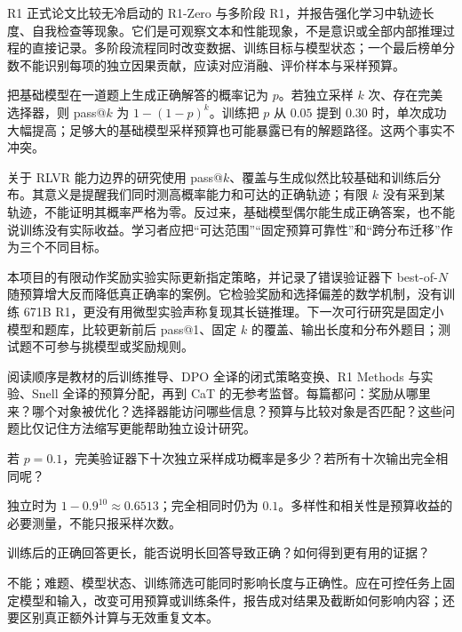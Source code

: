 R1 正式论文比较无冷启动的 R1-Zero 与多阶段 R1，并报告强化学习中轨迹长度、自我检查等现象。它们是可观察文本和性能现象，不是意识或全部内部推理过程的直接记录。多阶段流程同时改变数据、训练目标与模型状态；一个最后榜单分数不能识别每项的独立因果贡献，应读对应消融、评价样本与采样预算。

把基础模型在一道题上生成正确解答的概率记为 $p$。若独立采样 $k$ 次、存在完美选择器，则 pass@$k$ 为 $1-(1-p)^k$。训练把 $p$ 从 $0.05$ 提到 $0.30$ 时，单次成功大幅提高；足够大的基础模型采样预算也可能暴露已有的解题路径。这两个事实不冲突。

关于 RLVR 能力边界的研究\cite{rlvrboundary}使用 pass@$k$、覆盖与生成似然比较基础和训练后分布。其意义是提醒我们同时测高概率能力和可达的正确轨迹；有限 $k$ 没有采到某轨迹，不能证明其概率严格为零。反过来，基础模型偶尔能生成正确答案，也不能说训练没有实际收益。学习者应把“可达范围”“固定预算可靠性”和“跨分布迁移”作为三个不同目标。

本项目的有限动作奖励实验实际更新指定策略，并记录了错误验证器下 best-of-$N$ 随预算增大反而降低真正确率的案例。它检验奖励和选择偏差的数学机制，没有训练 671B R1，更没有用微型实验声称复现其长链推理。下一次可行研究是固定小模型和题库，比较更新前后 pass@1、固定 $k$ 的覆盖、输出长度和分布外题目；测试题不可参与挑模型或奖励规则。

阅读顺序是教材的后训练推导、DPO 全译的闭式策略变换、R1 Methods 与实验、Snell 全译的预算分配，再到 CaT 的无参考监督。每篇都问：奖励从哪里来？哪个对象被优化？选择器能访问哪些信息？预算与比较对象是否匹配？这些问题比仅记住方法缩写更能帮助独立设计研究。

\begin{exercise}
若 $p=0.1$，完美验证器下十次独立采样成功概率是多少？若所有十次输出完全相同呢？
\end{exercise}
\begin{solution}
独立时为 $1-0.9^{10}\approx0.6513$；完全相同时仍为 $0.1$。多样性和相关性是预算收益的必要测量，不能只报采样次数。
\end{solution}
\begin{exercise}
训练后的正确回答更长，能否说明长回答导致正确？如何得到更有用的证据？
\end{exercise}
\begin{solution}
不能；难题、模型状态、训练筛选可能同时影响长度与正确性。应在可控任务上固定模型和输入，改变可用预算或训练条件，报告成对结果及截断如何影响内容；还要区别真正额外计算与无效重复文本。
\end{solution}
